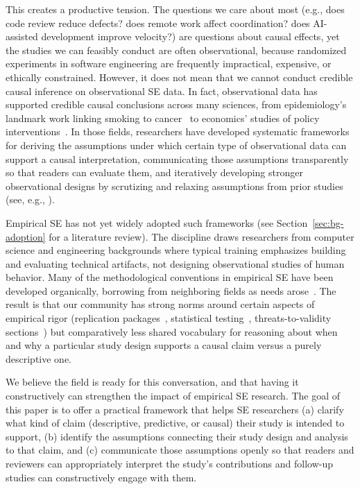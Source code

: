 This creates a productive tension. 
The questions we care about most (e.g., does code review reduce defects? does remote work affect coordination? does AI-assisted development improve velocity?) are questions about causal effects, yet the studies we can feasibly conduct are often observational, because randomized experiments in software engineering are frequently impractical, expensive, or ethically constrained. 
However, it does not mean that we cannot conduct credible causal inference on observational SE data.
In fact, observational data has supported credible causal conclusions across many sciences, from epidemiology's landmark work linking smoking to cancer~\cite{samet2016epidemiology} to economics' studies of policy interventions~\cite{abadie2018econometric}.
In those fields, researchers have developed systematic frameworks for deriving the assumptions under which certain type of observational data can support a causal interpretation, communicating those assumptions transparently so that readers can evaluate them, and iteratively developing stronger observational designs by scrutizing and relaxing assumptions from prior studies (see, e.g., \citet{angrist2010credibility, pearl2009causality, cunningham2021causal}).

Empirical SE has not yet widely adopted such frameworks (see Section~\ref{sec:bg-adoption} for a literature review). 
The discipline draws researchers from computer science and engineering backgrounds where typical training emphasizes building and evaluating technical artifacts, not designing observational studies of human behavior. 
Many of the methodological conventions in empirical SE have been developed organically, borrowing from neighboring fields as needs arose~\cite{DBLP:journals/jss/TichyLPH95, DBLP:books/sp/08/EasterbrookSSD08}.
The result is that our community has strong norms around certain aspects of empirical rigor (replication packages~\cite{DBLP:journals/corr/abs-2010-03525}, statistical testing~\cite{DBLP:books/sp/WohlinRHORW24}, threats-to-validity sections~\cite{DBLP:journals/tosem/RobillardAEGLNNSSS24}) but comparatively less shared vocabulary for reasoning about when and why a particular study design supports a causal claim versus a purely descriptive one.

We believe the field is ready for this conversation, and that having it constructively can strengthen the impact of empirical SE research. 
The goal of this paper is to offer a practical framework that helps SE researchers (a) clarify what kind of claim (descriptive, predictive, or causal) their study is intended to support, (b) identify the assumptions connecting their study design and analysis to that claim, and (c) communicate those assumptions openly so that readers and reviewers can appropriately interpret the study's contributions and follow-up studies can constructively engage with them.

